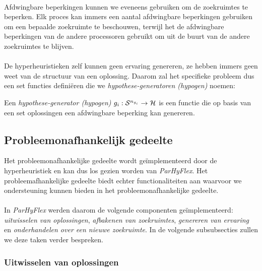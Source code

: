 \paragraph{}
Afdwingbare beperkingen kunnen we eveneens gebruiken om de zoekruimtes te beperken. Elk proces kan immers een aantal afdwingbare beperkingen gebruiken om een bepaalde zoekruimte te beschouwen, terwijl het de afdwingbare beperkingen van de andere processoren gebruikt om uit de buurt van de andere zoekruimtes te blijven.

\paragraph{}
De hyperheuristieken zelf kunnen geen ervaring genereren, ze hebben immers geen weet van de structuur van een oplossing. Daarom zal het specifieke probleem dus een set functies defini\"eren die we \emph{hypothese-generatoren (hypogen)} noemen:
\begin{definition}
Een \emph{hypothese-generator (hypogen)} $g_i:\mathcal{S}^{n_{g_i}}\rightarrow\mathcal{H}$ is een functie die op basis van een set oplossingen een afdwingbare beperking kan genereren.	
\end{definition}

\subsection{Probleemonafhankelijk gedeelte}

Het probleemonafhankelijke gedeelte wordt ge\"implementeerd door de hyperheuristiek en kan dus los gezien worden van \emph{ParHyFlex}. Het probleemafhankelijke gedeelte biedt echter functionaliteiten aan waarvoor we ondersteuning kunnen bieden in het probleemonafhankelijke gedeelte.

\paragraph{}
In \emph{ParHyFlex} werden daarom de volgende componenten ge\"implementeerd: \emph{uitwisselen van oplossingen}, \emph{afbakenen van zoekruimtes}, \emph{genereren van ervaring} en \emph{onderhandelen over een nieuwe zoekruimte}. In de volgende subsubsecties zullen we deze taken verder bespreken.

\subsubsection{Uitwisselen van oplossingen}

